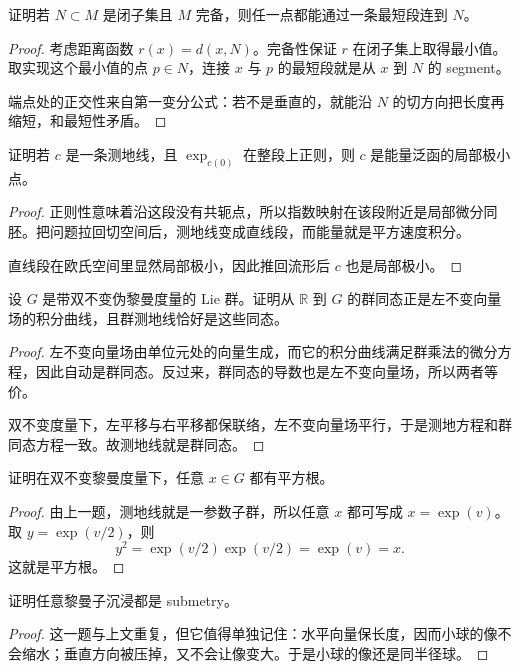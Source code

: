 \documentclass[11pt,a4paper,openany]{ctexbook}
\numberwithin{equation}{chapter}
\begin{document}
\begin{exercise}
证明若 \(N\subset M\) 是闭子集且 \(M\) 完备，则任一点都能通过一条最短段连到 \(N\)。
\end{exercise}
\begin{proof}
考虑距离函数 \(r(x)=d(x,N)\)。完备性保证 \(r\) 在闭子集上取得最小值。取实现这个最小值的点 \(p\in N\)，连接 \(x\) 与 \(p\) 的最短段就是从 \(x\) 到 \(N\) 的 segment。

端点处的正交性来自第一变分公式：若不是垂直的，就能沿 \(N\) 的切方向把长度再缩短，和最短性矛盾。
\end{proof}

\begin{exercise}
证明若 \(c\) 是一条测地线，且 \(\exp_{c(0)}\) 在整段上正则，则 \(c\) 是能量泛函的局部极小点。
\end{exercise}
\begin{proof}
正则性意味着沿这段没有共轭点，所以指数映射在该段附近是局部微分同胚。把问题拉回切空间后，测地线变成直线段，而能量就是平方速度积分。

直线段在欧氏空间里显然局部极小，因此推回流形后 \(c\) 也是局部极小。
\end{proof}

\begin{exercise}
设 \(G\) 是带双不变伪黎曼度量的 Lie 群。证明从 \(\mathbb R\) 到 \(G\) 的群同态正是左不变向量场的积分曲线，且群测地线恰好是这些同态。
\end{exercise}
\begin{proof}
左不变向量场由单位元处的向量生成，而它的积分曲线满足群乘法的微分方程，因此自动是群同态。反过来，群同态的导数也是左不变向量场，所以两者等价。

双不变度量下，左平移与右平移都保联络，左不变向量场平行，于是测地方程和群同态方程一致。故测地线就是群同态。
\end{proof}

\begin{exercise}
证明在双不变黎曼度量下，任意 \(x\in G\) 都有平方根。
\end{exercise}
\begin{proof}
由上一题，测地线就是一参数子群，所以任意 \(x\) 都可写成 \(x=\exp(v)\)。取 \(y=\exp(v/2)\)，则
\[
y^2=\exp(v/2)\exp(v/2)=\exp(v)=x.
\]
这就是平方根。
\end{proof}

\begin{exercise}
证明任意黎曼子沉浸都是 submetry。
\end{exercise}
\begin{proof}
这一题与上文重复，但它值得单独记住：水平向量保长度，因而小球的像不会缩水；垂直方向被压掉，又不会让像变大。于是小球的像还是同半径球。
\end{proof}
\end{document}
